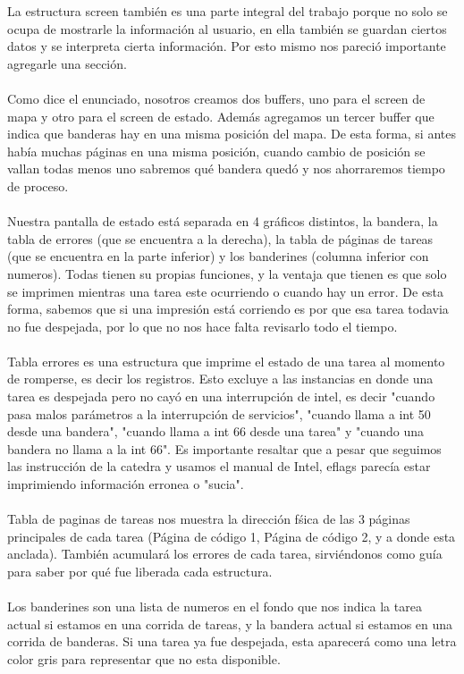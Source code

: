 La estructura screen tambi\'en es una parte integral del trabajo porque no solo se ocupa de mostrarle
la informaci\'on al usuario, en ella tambi\'en se guardan ciertos datos y se interpreta cierta informaci\'on.
Por esto mismo nos pareci\'o importante agregarle una secci\'on.\\
\\
Como dice el enunciado, nosotros creamos dos buffers, uno para el screen de mapa y otro para el screen 
de estado. Adem\'as agregamos un tercer buffer que indica que banderas hay en una misma posici\'on del mapa. De esta forma, si antes hab\'ia muchas p\'aginas en una misma posici\'on, cuando cambio de posici\'on se vallan todas menos uno sabremos qu\'e bandera qued\'o y nos ahorraremos tiempo de proceso.\\
\\
Nuestra pantalla de estado est\'a separada en 4 gr\'aficos distintos, la bandera, la tabla de errores (que se encuentra a la derecha), la tabla de p\'aginas de tareas (que se encuentra en la parte inferior) y los banderines (columna inferior con numeros). Todas tienen su propias funciones, y la ventaja que tienen es que solo se imprimen mientras una tarea este ocurriendo o cuando hay un error. De esta forma, sabemos que si una impresi\'on est\'a corriendo es por que esa tarea todavia no fue despejada, por lo que no nos hace falta revisarlo todo el tiempo.\\
\\
Tabla errores es una estructura que imprime el estado de una tarea al momento de romperse, es decir los registros. Esto excluye a las instancias en donde una tarea es despejada pero no cay\'o en una interrupci\'on de intel, es decir "cuando pasa malos par\'ametros a la interrupci\'on de servicios", "cuando llama a int 50 desde una bandera", "cuando llama a int 66 desde una tarea" y "cuando una bandera no llama a la int 66". Es importante resaltar que a pesar que seguimos las instrucci\'on de la catedra y usamos el manual de Intel, eflags parec\'ia estar imprimiendo informaci\'on erronea o "sucia".\\
\\
Tabla de paginas de tareas nos muestra la direcci\'on f\'sica de las 3 p\'aginas principales de cada tarea (P\'agina de c\'odigo 1, P\'agina de c\'odigo 2, y a donde esta anclada). Tambi\'en acumular\'a los errores de cada tarea, sirvi\'endonos como gu\'ia para saber por qu\'e fue liberada cada estructura.\\
\\
Los banderines son una lista de numeros en el fondo que nos indica la tarea actual si estamos en una corrida de tareas, y la bandera actual si estamos en una corrida de banderas. Si una tarea ya fue despejada, esta aparecer\'a como una letra color gris para representar que no esta disponible.
